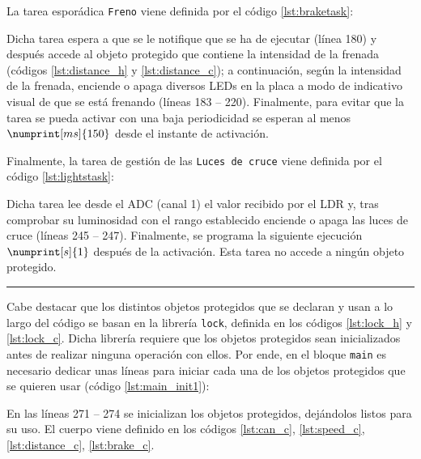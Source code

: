 La tarea esporádica \texttt{Freno} viene definida por el código \ref{lst:braketask}:



Dicha tarea espera a que se le notifique que se ha de ejecutar (línea 180) y después accede
al objeto protegido que contiene la intensidad de la frenada (códigos \ref{lst:distance_h} y
\ref{lst:distance_c}); a continuación, según la intensidad de la frenada, enciende o
apaga diversos LEDs en la placa a modo de indicativo visual de que se está frenando
(líneas 183 -- 220). Finalmente, para evitar que la tarea se pueda activar con una
baja periodicidad se esperan al menos $\numprint[ms]{150}$ desde el instante de activación.

Finalmente, la tarea de gestión de las \texttt{Luces de cruce} viene definida por el código
\ref{lst:lightstask}:



Dicha tarea lee desde el ADC (canal 1) el valor recibido por el LDR y, tras comprobar
su luminosidad con el rango establecido enciende o apaga las luces de cruce (líneas 245 -- 247).
Finalmente, se programa la siguiente ejecución $\numprint[s]{1}$ después de la
activación. Esta tarea no accede a ningún objeto protegido.\\
\rule{\linewidth}{.2pt}

Cabe destacar que los distintos objetos protegidos que se declaran y usan a lo largo
del código se basan en la librería \texttt{lock}, definida en los códigos \ref{lst:lock_h}
y \ref{lst:lock_c}. Dicha librería requiere que los objetos protegidos sean inicializados
antes de realizar ninguna operación con ellos. Por ende, en el bloque \texttt{main} es
necesario dedicar unas líneas para iniciar cada una de los objetos protegidos que se
quieren usar (código \ref{lst:main_init1}):



En las líneas 271 -- 274 se inicializan los objetos protegidos, dejándolos listos para su
uso. El cuerpo viene definido en los códigos \ref{lst:can_c}, \ref{lst:speed_c},
\ref{lst:distance_c}, \ref{lst:brake_c}.
